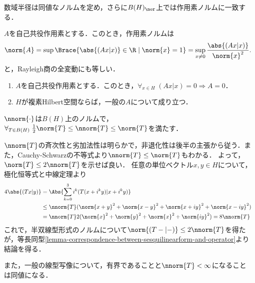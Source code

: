 \documentclass[uplatex,dvipdfmx]{jsreport}
\begin{document}
\begin{tcolorbox}[colframe=ForestGreen, colback=ForestGreen!10!white,breakable,colbacktitle=ForestGreen!40!white,coltitle=black,fonttitle=\bfseries\sffamily,
title=]
    数域半径は同値なノルムを定め，さらに$B(H)_\nor$上では作用素ノルムに一致する．
\end{tcolorbox}

\begin{proposition}[自己共役作用素の作用素ノルム]\label{prop-operator-norm-of-self-adjoint-operator}
    $A$を自己共役作用素とする．このとき，作用素ノルムは
    \[\norm{A}=\sup\Brace{\abs{(Ax|x)}\in\R\mid\norm{x}=1}=\sup_{x\ne0}\frac{\abs{(Ax|x)}}{\norm{x}^2}.\]
    と，Rayleigh商の全変動にも等しい．
\end{proposition}

\begin{corollary}[半内積の非退化性]\label{cor-nondegeneratedness-of-semi-inner-product}\mbox{}
    \begin{enumerate}
        \item $A$を自己共役作用素とする．このとき，$\forall_{x\in H}\;(Ax|x)=0\Rightarrow A=0$．
        \item $H$が複素Hilbert空間ならば，一般の$A$について成り立つ．
    \end{enumerate}
\end{corollary}

\begin{proposition}[数域半径は同値なノルムを定める]
    $\nnorm{\cdot}$は$B(H)$上のノルムで，$\forall_{T\in B(H)}\;\frac{1}{2}\norm{T}\le\nnorm{T}\le\norm{T}$を満たす．
\end{proposition}
\begin{Proof}
    $\nnorm{T}$の斉次性と劣加法性は明らかで，非退化性は後半の主張から従う．また，Cauchy-Schwarzの不等式より$\nnorm{T}\le\norm{T}$もわかる．
    よって，$\norm{T}\le 2\nnorm{T}$を示せば良い．
    任意の単位ベクトル$x,y\in H$について，極化恒等式と中線定理より
    \begin{align*}
        4\abs{(Tx|y)}&=\Abs{\sum^3_{k=0}i^k(T(x+i^ky)|x+i^ky)}\\
        &\le\nnorm{T}(\norm{x+y}^2+\norm{x-y}^2+\norm{x+iy}^2+\norm{x-iy}^2)\\
        &=\nnorm{T}2(\norm{x}^2+\norm{y}^2+\norm{x}^2+\norm{iy}^2)=8\nnorm{T}
    \end{align*}
    これで，半双線型形式のノルムについて$\norm{(T-|-)}\le2\nnorm{T}$を得たが，等長同型\ref{lemma-correspondence-between-sesquilinearform-and-operator}より結論を得る．
\end{Proof}
\begin{remarks}
    また，一般の線型写像について，有界であることと$\nnorm{T}<\infty$になることは同値になる．
\end{remarks}
\end{document}
